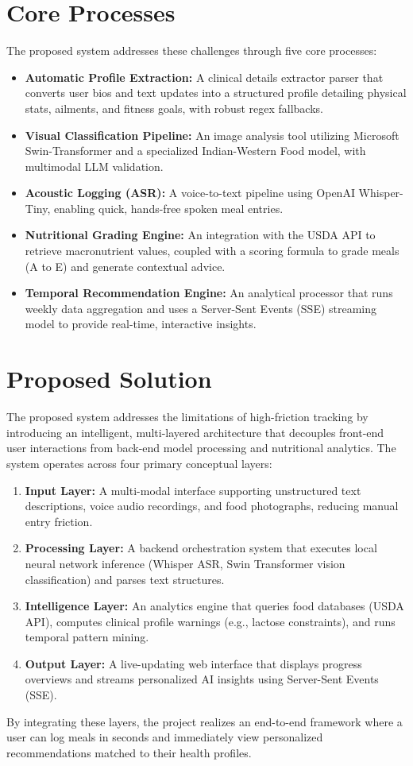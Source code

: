 \documentclass[12pt,a4paper,oneside]{report}
\begin{document}
\section{Core Processes}
The proposed system addresses these challenges through five core processes:
\begin{itemize}
    \item \textbf{Automatic Profile Extraction:} A clinical details extractor parser that converts user bios and text updates into a structured profile detailing physical stats, ailments, and fitness goals, with robust regex fallbacks.
    \item \textbf{Visual Classification Pipeline:} An image analysis tool utilizing Microsoft Swin-Transformer and a specialized Indian-Western Food model, with multimodal LLM validation.
    \item \textbf{Acoustic Logging (ASR):} A voice-to-text pipeline using OpenAI Whisper-Tiny, enabling quick, hands-free spoken meal entries.
    \item \textbf{Nutritional Grading Engine:} An integration with the USDA API to retrieve macronutrient values, coupled with a scoring formula to grade meals (A to E) and generate contextual advice.
    \item \textbf{Temporal Recommendation Engine:} An analytical processor that runs weekly data aggregation and uses a Server-Sent Events (SSE) streaming model to provide real-time, interactive insights.
\end{itemize}

\section{Proposed Solution}
The proposed system addresses the limitations of high-friction tracking by introducing an intelligent, multi-layered architecture that decouples front-end user interactions from back-end model processing and nutritional analytics. The system operates across four primary conceptual layers:
\begin{enumerate}
    \item \textbf{Input Layer:} A multi-modal interface supporting unstructured text descriptions, voice audio recordings, and food photographs, reducing manual entry friction.
    \item \textbf{Processing Layer:} A backend orchestration system that executes local neural network inference (Whisper ASR, Swin Transformer vision classification) and parses text structures.
    \item \textbf{Intelligence Layer:} An analytics engine that queries food databases (USDA API), computes clinical profile warnings (e.g., lactose constraints), and runs temporal pattern mining.
    \item \textbf{Output Layer:} A live-updating web interface that displays progress overviews and streams personalized AI insights using Server-Sent Events (SSE).
\end{enumerate}
By integrating these layers, the project realizes an end-to-end framework where a user can log meals in seconds and immediately view personalized recommendations matched to their health profiles.
\end{document}
